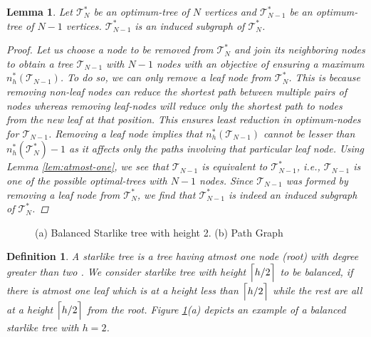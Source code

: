 \documentclass[letterpaper]{article} \usepackage{aaai20}  \usepackage{times}  \usepackage{helvet} \usepackage{courier}  \usepackage[hyphens]{url}  \usepackage{graphicx} \urlstyle{rm} \def\UrlFont{\rm}  \usepackage{graphicx}  \frenchspacing  \setlength{\pdfpagewidth}{8.5in}  \setlength{\pdfpageheight}{11in}
\newtheorem{definition}{Definition}
\newtheorem{lemma}{Lemma}
\begin{document}
	
\begin{lemma}
		\label{lem:sub-graph-optimality}
		Let $\mathcal{T}^{*}_{N}$ be an optimum-tree of $N$ vertices and $\mathcal{T}^{*}_{N-1}$ be an optimum-tree of $N-1$ vertices. $\mathcal{T}^{*}_{N-1}$ is an induced subgraph of $\mathcal{T}^{*}_{N}$.
		\begin{proof}
Let us choose a node to be removed from $\mathcal{T}^{*}_{N}$ and join its neighboring nodes to obtain a tree $\mathcal{T}_{N-1}$ with $N-1$ nodes with an objective of ensuring a maximum $n^{*}_{h}(\mathcal{T}_{N-1})$. To do so, we can only remove a leaf node from $\mathcal{T}^{*}_{N}$. This is because removing non-leaf nodes can reduce the shortest path between multiple pairs of nodes whereas removing leaf-nodes will reduce only the shortest path to nodes from the new leaf at that position. This ensures least reduction in optimum-nodes for $\mathcal{T}_{N-1}$.
			Removing a leaf node implies that $n^{*}_{h}(\mathcal{T}_{N-1})$ cannot be lesser than $n^{*}_{h}(\mathcal{T}^{*}_{N})-1$ as it affects only the paths involving that particular leaf node. Using Lemma \ref{lem:atmost-one}, we see that $\mathcal{T}_{N-1}$ is equivalent to $\mathcal{T}^{*}_{N-1}$, i.e., $\mathcal{T}_{N-1}$ is one of the possible optimal-trees with $N-1$ nodes. Since $\mathcal{T}_{N-1}$ was formed by removing a leaf node from $\mathcal{T}^{*}_{N}$, we find that $\mathcal{T}^{*}_{N-1}$ is indeed an induced subgraph of $\mathcal{T}^{*}_{N}$.

		\end{proof}
	\end{lemma}
	
	\begin{figure}[t]
		\centering
		\caption{ (a) Balanced Starlike tree with height 2. (b) Path Graph}
		\label{fig:graphs}
	\end{figure}
	


	\begin{definition}
		A starlike tree is a tree having atmost one node (root) with degree greater than two \cite{starlike-tree}. We consider starlike tree with height $\Bigl \lceil h/2 \Bigl \rceil$ to be \textit{balanced}, if there is atmost one leaf which is at a height less than $\Bigl \lceil h/2 \Bigl \rceil$ while the rest are all at a height $\Bigl \lceil h/2 \Bigl \rceil$ from the root. Figure \ref{fig:graphs}(a) depicts an example of a balanced starlike tree with $h=2$.
	\end{definition}
	
\end{document}

